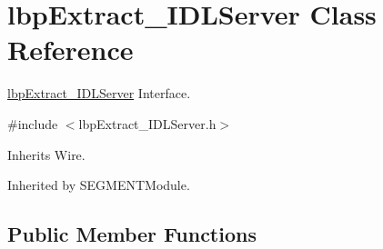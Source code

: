 \section{lbp\+Extract\+\_\+\+I\+D\+L\+Server Class Reference}
\label{classlbpExtract__IDLServer}


\mbox{\hyperlink{classlbpExtract__IDLServer}{lbp\+Extract\+\_\+\+I\+D\+L\+Server}} Interface.  




{\ttfamily \#include $<$lbp\+Extract\+\_\+\+I\+D\+L\+Server.\+h$>$}



Inherits Wire.



Inherited by S\+E\+G\+M\+E\+N\+T\+Module.

\subsection*{Public Member Functions}
